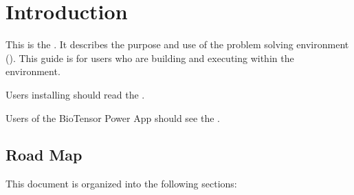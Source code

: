 %
%
%
%
%

%

\chapter{Introduction}
\label{ch:intro}


This is the \etitle{\srug}.  It describes the purpose and use of the
\sr{} problem solving environment (\pse).  This guide is for users who
are building and executing  within the \sr{}
environment.

Users installing \sr{} should read the
.

Users of the BioTensor Power App should see the
.



\section{Road Map}
\label{sec:roadmap}

This document is organized into the following sections:

